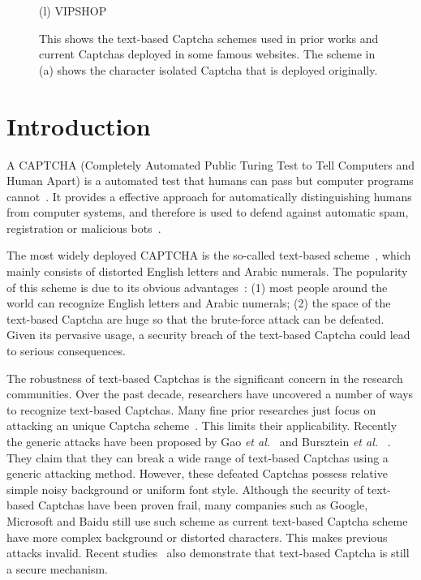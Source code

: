 \begin{figure}[!t]
{\begin{minipage}[t]{0.20\textwidth}
                    \center (l) VIPSHOP
                \end{minipage}
            }
            \caption{This shows the text-based Captcha schemes used in prior works and current Captchas deployed in some famous websites. The scheme in (a) shows the character isolated Captcha that is deployed originally.}
            \label{fig:text-based captchas}
        \end{figure}
\section{Introduction}

A CAPTCHA (Completely Automated Public Turing Test to Tell Computers and Human Apart) is a automated test that humans can pass but computer programs cannot~\cite{Von2004Telling}. It provides a effective approach for automatically distinguishing humans from computer systems, and therefore is used to defend against automatic spam, registration or malicious bots~\cite{Von2003CAPTCHA,Tam2008Breaking}.

The most widely deployed CAPTCHA is the so-called text-based scheme~\cite{Yan2008Usability}, which mainly consists of distorted English letters and Arabic numerals. The popularity of this scheme is due to its obvious advantages~\cite{Chellapilla2005Building,Chellapilla2005Computers}: (1) most people around the world can recognize English letters and Arabic numerals; (2) the space of the text-based Captcha are huge so that the brute-force attack can be defeated. Given its pervasive usage, a security breach of the text-based Captcha could lead to serious consequences.

The robustness of text-based Captchas is the significant concern in the research communities. Over the past decade, researchers have uncovered a number of ways to recognize text-based Captchas. Many fine prior researches just focus on attacking an unique Captcha scheme~\cite{Gao2013The,Gao2017Research,Mohamed2014A,Yan2008A}. This limits their applicability. Recently the generic attacks have been proposed by Gao \emph{et al.}~\cite{Gao2016A} and Bursztein \emph{et al.} ~\cite{Bursztein2011Text,Bursztein2014The}. They claim that they can break a wide range of text-based Captchas using a generic attacking method. However, these defeated Captchas possess relative simple noisy background or uniform font style. Although the security of text-based Captchas have been proven frail, many companies such as Google, Microsoft and Baidu still use such scheme as current text-based Captcha scheme have more complex background or distorted characters. This makes previous attacks invalid.  Recent studies~\cite{Thomas2013Trafficking,Bursztein2014Easy} also demonstrate that text-based Captcha is still a secure mechanism.

